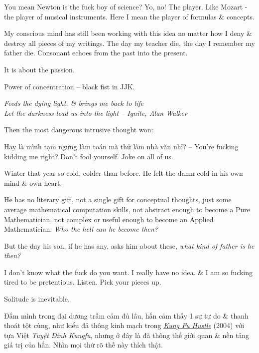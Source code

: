 \documentclass[12pt]{article}
\begin{document}
You mean Newton is the fuck boy of science? Yo, no! The player. Like Mozart - the player of musical instruments. Here I mean the player of formulas \& concepts.

My conscious mind has still been working with this idea no matter how I deny \& destroy all pieces of my writings. The day my teacher die, the day I remember my father die. Consonant echoes from the past into the present. 

It is about the passion.

Power of concentration -- black fist in JJK.

\begin{center}\it
	Feeds the dying light, \& brings me back to life\\
	Let the darkness lead us into the light 
	-- Ignite, {\sc Alan Walker}
\end{center}
Then the most dangerous intrusive thought won:

Hay là mình tạm ngưng làm toán mà thử làm nhà văn nhỉ? -- You're fucking kidding me right? Don't fool yourself. Joke on all of us.

Winter that year so cold, colder than before. He felt the damn cold in his own mind \& own heart.

He has no literary gift, not a single gift for conceptual thoughts, just some average mathematical computation skills, not abstract enough to become a Pure Mathematician, not complex or useful enough to become an Applied Mathematician. {\it Who the hell can he become then?}

But the day his son, if he has any, asks him about these, {\it what kind of father is he then?}

I don't know what the fuck do you want. I really have no idea. \& I am so fucking tired to be pretentious. Listen. Pick your pieces up.

Solitude is inevitable.

Đắm mình trong đại dương trầm cảm đủ lâu, hắn cảm thấy 1 sự tự do \& thanh thoát tột cùng, như kiểu đả thông kinh mạch trong \href{https://www.imdb.com/title/tt0373074/}{\it Kung Fu Hustle} (2004) với tựa Việt {\it Tuyệt Đỉnh Kungfu}, nhưng ở đây là đã thông thế giới quan \& nền tảng giá trị của hắn. Nhìn mọi thứ rõ thế này thích thật.
\end{document}
